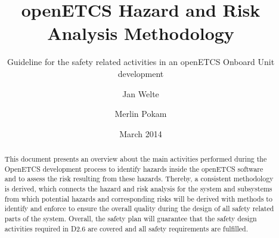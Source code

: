 \documentclass{template/openetcs_report}
\begin{document}
\frontmatter
{}




\title{openETCS Hazard and Risk Analysis Methodology}

\subtitle{Guideline for the safety related activities in an openETCS Onboard Unit development}

\date{March 2014} %


\author{Jan Welte}

  
  
\author{Merlin Pokam}








\begin{abstract}
This document presents an overview about the main activities performed during the OpenETCS development process to identify hazards inside the openETCS software and to assess the risk resulting from these hazards. Thereby, a consistent methodology is derived, which connects the hazard and risk analysis for the system and subsystems from which potential hazards and corresponding risks will be derived with methods to identify and enforce  to ensure the overall quality during the design of all safety related parts of the system. Overall, the safety plan will guarantee that the safety design activities required in D2.6 are covered and all safety requirements are fulfilled. 
\end{abstract}
\end{document}
